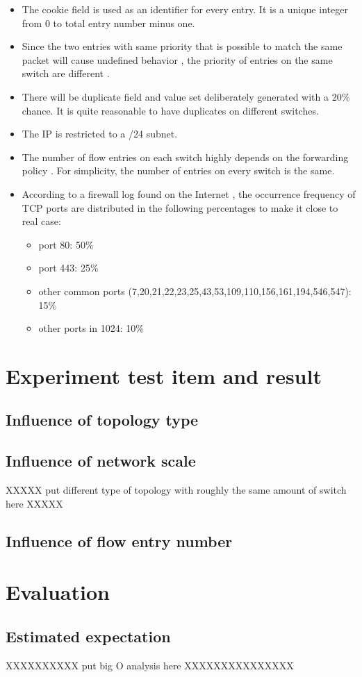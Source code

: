 \begin{itemize}
\item 
The cookie field is used as an identifier for every entry. It is a unique integer from 0 to total entry number minus one. 
\item
Since the two entries with same priority that is possible to match the same packet will cause undefined behavior \cite{OF_SPEC}, the priority of entries on the same switch are different .
\item
There will be duplicate field and value set deliberately generated with a 20\% chance. It is quite reasonable to have duplicates on different switches. 
\item
The IP is restricted to a /24 subnet.
\item
The number of flow entries on each switch highly depends on the forwarding policy \cite{MPFHMRSV09}. For simplicity, the number of entries on every switch is the same. 
\item
According to a firewall log found on the Internet \cite{PORT_FREQ}, the occurrence frequency of TCP ports are distributed in the following percentages to make it close to real case:
\begin{itemize}
\item
port 80: 50\%
\item
port 443: 25\%
\item
other common ports (7,20,21,22,23,25,43,53,109,110,156,161,194,546,547): 15\%
\item
other ports in 1024: 10\%
\end{itemize}
\end{itemize}

\section{Experiment test item and result}

\subsection{Influence of topology type}

\subsection{Influence of network scale}
XXXXX put different type of topology with roughly the same amount of switch here XXXXX
\subsection{Influence of flow entry number}


\section{Evaluation}

\subsection{Estimated expectation}
XXXXXXXXXX put big O analysis here XXXXXXXXXXXXXXX
